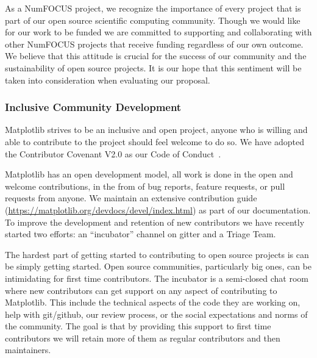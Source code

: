 \documentclass[12pt]{article}
\numberwithin{page}{section}
\begin{document}
As a NumFOCUS project, we recognize the importance of every project
that is part of our open source scientific computing community. Though
we would like for our work to be funded we are committed to supporting
and collaborating with other NumFOCUS projects that receive funding
regardless of our own outcome. We believe that this attitude is
crucial for the success of our community and the sustainability of
open source projects. It is our hope that this sentiment will be taken
into consideration when evaluating our proposal.


\subsubsection{Inclusive Community Development}

Matplotlib strives to be an inclusive and open project, anyone who is
willing and able to contribute to the project should feel welcome to
do so.  We have adopted the Contributor Covenant V2.0 as
our Code of Conduct~\cite{CoC}.

Matplotlib has an open development model, all work is done in the open
and welcome contributions, in the from of bug reports, feature
requests, or pull requests from anyone.  We maintain an extensive
contribution guide
(\url{https://matplotlib.org/devdocs/devel/index.html}) as part of our
documentation.  To improve the development and retention of new
contributors we have recently started two efforts: an ``incubator''
channel on gitter and a Triage Team.

%

The hardest part of getting started to contributing to open source
projects is can be simply getting started.  Open source communities,
particularly big ones, can be intimidating for first time
contributors.  The incubator is a semi-closed chat room where new
contributors can get support on any aspect of contributing to
Matplotlib.  This include the technical aspects of the code they are
working on, help with git/github, our review process, or the social
expectations and norms of the community.  The goal is that by
providing this support to first time contributors we will retain more
of them as regular contributors and then maintainers.
\end{document}
